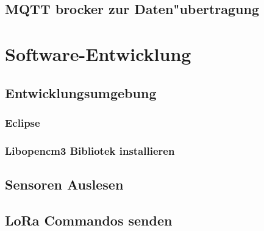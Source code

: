 \vspace{10cm}   
\section{MQTT brocker zur Daten"ubertragung}


\chapter{Software-Entwicklung}\label{Soft-Ent}
\section{Entwicklungsumgebung}
\subsection{Eclipse}
\subsection{Libopencm3 Bibliotek installieren}
\section{Sensoren Auslesen} \label{Sensoren}
\section{LoRa Commandos senden}

